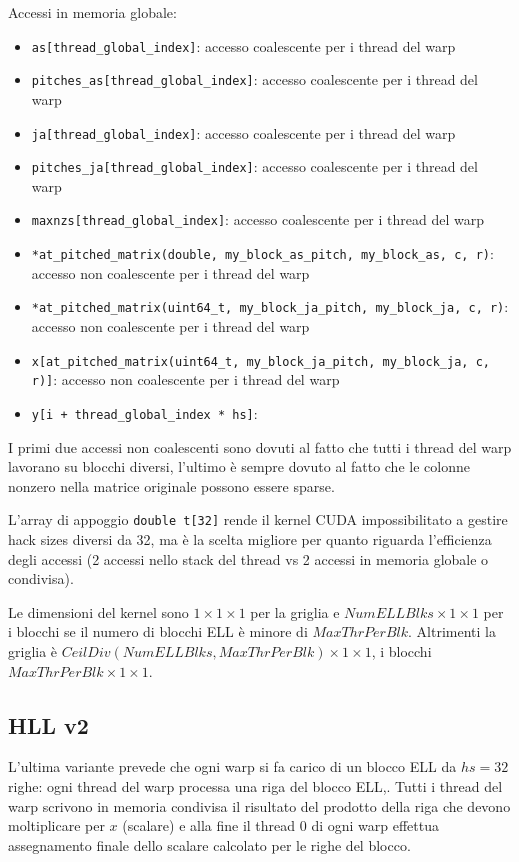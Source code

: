 \documentclass[9pt]{extarticle}
\begin{document}
Accessi in memoria globale:
\begin{itemize}
	\item \texttt{as[thread\_global\_index]}: accesso coalescente per i thread del warp
	\item \texttt{pitches\_as[thread\_global\_index]}: accesso coalescente per i thread del warp
	\item \texttt{ja[thread\_global\_index]}: accesso coalescente per i thread del warp
	\item \texttt{pitches\_ja[thread\_global\_index]}: accesso coalescente per i thread del warp
	\item \texttt{maxnzs[thread\_global\_index]}: accesso coalescente per i thread del warp
	\item \texttt{*at\_pitched\_matrix(double, my\_block\_as\_pitch, my\_block\_as, c, r)}: accesso non coalescente per i 
	thread del warp
	\item \texttt{*at\_pitched\_matrix(uint64\_t, my\_block\_ja\_pitch, my\_block\_ja, c, r)}: accesso non coalescente per 
	i thread del warp
	\item \texttt{x[\*at\_pitched\_matrix(uint64\_t, my\_block\_ja\_pitch, my\_block\_ja, c, r)]}: accesso non coalescente 
	per i thread del warp
	\item \texttt{y[i + thread\_global\_index * hs]}:
\end{itemize}

I primi due accessi non coalescenti sono dovuti al fatto che tutti i thread del warp lavorano su blocchi diversi,
l'ultimo è sempre dovuto al fatto che le colonne nonzero nella matrice originale possono essere sparse.

L'array di appoggio \texttt{double t[32]} rende il kernel CUDA impossibilitato a gestire hack sizes diversi da 32, 
ma è la scelta migliore per quanto riguarda l'efficienza degli accessi (2 accessi nello stack del thread vs 2 accessi
in memoria globale o condivisa).

Le dimensioni del kernel sono $1 \times 1 \times 1$ per la griglia e $NumELLBlks \times 1 \times 1$ per i blocchi se il numero di blocchi ELL è minore di $MaxThrPerBlk$. Altrimenti la griglia è $CeilDiv(NumELLBlks, MaxThrPerBlk) \times 1 \times 1$, i blocchi $MaxThrPerBlk \times 1 \times 1$. 

\subsection{HLL v2}
L'ultima variante prevede che ogni warp si fa carico di un blocco ELL da $hs=32$ righe: ogni thread del warp processa
una riga del blocco ELL,. Tutti i thread del warp scrivono in memoria condivisa il risultato del prodotto della riga che
devono moltiplicare per $x$ (scalare)
e alla fine il thread 0 di ogni warp effettua assegnamento finale dello scalare calcolato per 
le righe del blocco.
\end{document}
